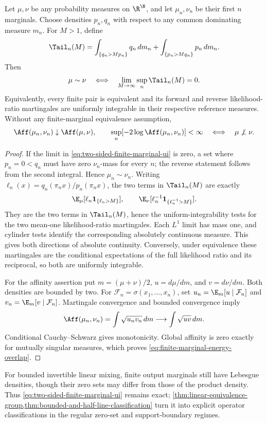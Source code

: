 \begin{proposition}
\label{prop:two-sided-finite-marginal-ratio-tails}
Let \(\mu,\nu\) be any probability measures on \(\R^\N\), and let
\(\mu_n,\nu_n\) be their first \(n\) marginals.
Choose densities \(p_n,q_n\) with respect to any common dominating
measure \(m_n\).
For \(M>1\), define
\[
 \Tail_n(M)=
 \int_{\{q_n>Mp_n\}}q_n\,dm_n+
 \int_{\{p_n>Mq_n\}}p_n\,dm_n.
\]
Then
\begin{equation}
 \mu\sim\nu
 \quad\Longleftrightarrow\quad
 \lim_{M\to\infty}\sup_n\Tail_n(M)=0.
 \label{eq:two-sided-finite-marginal-ui}
\end{equation}
Equivalently, every finite pair is equivalent and its forward and
reverse likelihood-ratio martingales are uniformly integrable in their
respective reference measures.
Without any finite-marginal equivalence assumption,
\begin{equation}
 \Aff(\mu_n,\nu_n)\downarrow\Aff(\mu,\nu),\qquad
 \sup_n[-2\log\Aff(\mu_n,\nu_n)]<\infty
     \quad\Longleftrightarrow\quad \mu\not\perp\nu.
 \label{eq:finite-marginal-energy-overlap}
\end{equation}
\end{proposition}
\begin{proof}
If the limit in \eqref{eq:two-sided-finite-marginal-ui} is zero, a set
where \(p_n=0<q_n\) must have zero \(\nu_n\)-mass for every \(n\);
the reverse statement follows from the second integral.
Hence \(\mu_n\sim\nu_n\).
Writing \(\ell_n(x)=q_n(\pi_n x)/p_n(\pi_n x)\), the two terms in
\(\Tail_n(M)\) are exactly
\[
 \E_\mu[\ell_n\mathbf1_{\{\ell_n>M\}}],
 \qquad
 \E_\nu[\ell_n^{-1}\mathbf1_{\{\ell_n^{-1}>M\}}].
\]
They are the two terms in \(\Tail_n(M)\), hence the
uniform-integrability tests for the two mean-one
likelihood-ratio martingales.
Each \(L^1\) limit has mass one, and cylinder tests identify the
corresponding absolutely continuous measure.
This gives both directions of absolute continuity.
Conversely, under equivalence these martingales are the conditional
expectations of the full likelihood ratio and its reciprocal, so both
are uniformly integrable.

For the affinity assertion put \(m=(\mu+\nu)/2\),
\(u=d\mu/dm\), and \(v=d\nu/dm\).
Both densities are bounded by two.
For \(\mathcal F_n=\sigma(x_1,\ldots,x_n)\), set
\(u_n=\E_m[u\mid\mathcal F_n]\) and
\(v_n=\E_m[v\mid\mathcal F_n]\).
Martingale convergence and bounded convergence imply
\[
 \Aff(\mu_n,\nu_n)
       =\int\sqrt{u_nv_n}\,dm
       \longrightarrow\int\sqrt{uv}\,dm.
\]
Conditional Cauchy--Schwarz gives monotonicity.
Global affinity is zero exactly for mutually singular measures,
which proves \eqref{eq:finite-marginal-energy-overlap}.
\end{proof}

For bounded invertible linear mixing, finite output marginals still have
Lebesgue densities, though their zero sets may differ from those of the product
density.  Thus \eqref{eq:two-sided-finite-marginal-ui} remains exact;
\cref{thm:linear-equivalence-group,thm:bounded-and-half-line-classification}
turn it into explicit operator classifications in the regular zero-set and
support-boundary regimes.
